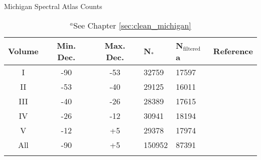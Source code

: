 {\footnotesize
\begin{table}[t]
    \caption{Michigan Spectral Atlas Counts}
    \begin{tabular}{cccllc}
    \toprule
    Volume & Min. Dec. & Max. Dec. & N$_{*}$ & N$_{\mbox{filtered}}$a & Reference \\ \midrule
    I & -90 & -53 & 32759 & 17597 & \citet{Houk1975} \\
    II & -53 & -40 & 29125 & 16011 & \citet{Houk1978} \\
    III & -40 & -26 & 28389 & 17615 & \citet{Houk1982} \\
    IV & -26 & -12 & 30941 & 18194 & \citet{Houk1988} \\
    V & -12 & +5 & 29378 & 17974 & \citet{Houk1999} \\
    All & -90 & +5 & 150952 & 87391 & \\
    \bottomrule
    \addlinespace[10pt]
    
    \end{tabular}
    \caption*{$^{a}$See Chapter \ref{sec:clean_michigan}}
    \label{table:michigan_populations}

\end{table}
}